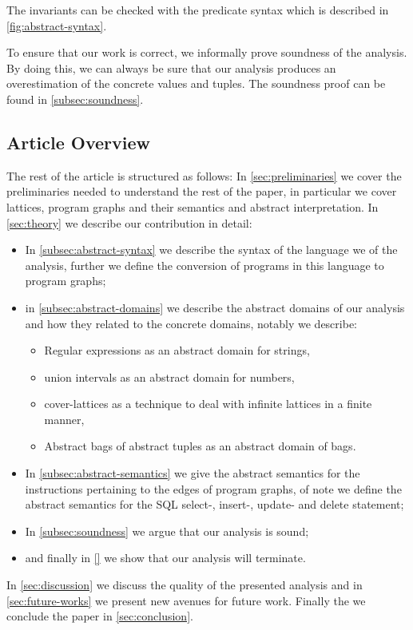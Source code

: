 The invariants can be checked with the predicate syntax which is described in \autoref{fig:abstract-syntax}.

To ensure that our work is correct, we informally prove soundness of the analysis.
By doing this, we can always be sure that our analysis produces an overestimation of the concrete values and tuples.
The soundness proof can be found in \autoref{subsec:soundness}.

\subsection{Article Overview}\label{subsec:article-overview}
The rest of the article is structured as follows:
In \autoref{sec:preliminaries} we cover the preliminaries needed to understand the rest of the paper, in particular we cover lattices, program graphs and their semantics and abstract interpretation.
In \autoref{sec:theory} we describe our contribution in detail:

\begin{itemize}
    \item In \autoref{subsec:abstract-syntax} we describe the syntax of the language we of the analysis, further we define the conversion of programs in this language to program graphs;
    \item in \autoref{subsec:abstract-domains} we describe the abstract domains of our analysis and how they related to the concrete domains, notably we describe:
    \begin{itemize}
        \item Regular expressions as an abstract domain for strings,
        \item union intervals as an abstract domain for numbers,
        \item cover-lattices as a technique to deal with infinite lattices in a finite manner,
        \item Abstract bags of abstract tuples as an abstract domain of bags.
    \end{itemize}
    \item In \autoref{subsec:abstract-semantics} we give the abstract semantics for the instructions pertaining to the edges of program graphs, of note we define the abstract semantics for the SQL select-, insert-, update- and delete statement;
    \item In \autoref{subsec:soundness} we argue that our analysis is sound;
    \item and finally in \autoref{} we show that our analysis will terminate.
\end{itemize}

In \autoref{sec:discussion} we discuss the quality of the presented analysis and in \autoref{sec:future-works} we present new avenues for future work.
Finally the we conclude the paper in \autoref{sec:conclusion}.



